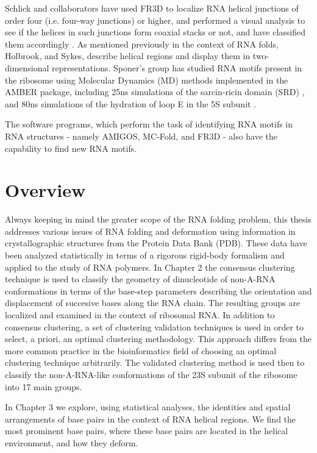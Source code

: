 Schlick and collaborators have used FR3D
to  localize  RNA helical  junctions  of  order  four (i.e.   four-way
junctions) or  higher, and performed a  visual analysis to  see if the
helices  in  such junctions  form  coaxial  stacks  or not,  and  have
classified   them   accordingly   \cite{laing2009,  laing2009a}.    As
mentioned previously in the context of RNA folds, Holbrook, and Sykes,
describe   helical  regions  and   display  them   in  two-dimensional
representations. Sponer's group has studied  RNA
motifs present  in the ribosome using Molecular  Dynamics (MD) methods
implemented  in   the  AMBER   package,   including 25ns
simulations  of   the  sarcin-ricin  domain  (SRD)
\cite{spackova2006},  and 80ns simulations  of the  hydration of
loop E in the 5S subunit \cite{reblova2003}.

The software programs, which perform the task of identifying RNA motifs
in RNA structures - namely AMIGOS, MC-Fold, and FR3D - also have the
capability to find new RNA motifs.

\section{Overview}
Always keeping in  mind the greater scope of  the RNA folding problem,
this thesis  addresses various issues  of RNA folding  and deformation
using information in crystallographic structures from the Protein Data
Bank (PDB). These data have  been analyzed statistically in terms of a
rigorous  rigid-body  formalism  and  applied  to  the  study  of  RNA
polymers.  In Chapter 2 the  consensus clustering technique is used to
classify the  geometry of  dinucleotide of non-A-RNA  conformations in
terms  of  the base-step  parameters  describing  the orientation  and
displacement of  succesive bases along  the RNA chain.   The resulting
groups are localized and examined in the context of ribosomal RNA.  In
addition  to  consensus clustering,  a  set  of clustering  validation
techniques is used in order to select, a priori, an optimal clustering
methodology. This  approach differs from  the more common  practice in
the bioinformatics  field of choosing an  optimal clustering technique
arbitrarily.  The validated clustering method is used then to classify
the non-A-RNA-like  conformations of the  23S subunit of  the ribosome
into 17 main groups.

In Chapter  3 we explore,  using statistical analyses,  the identities
and spatial arrangements  of base pairs in the  context of RNA helical
regions. We find the most prominent base pairs, where these base pairs
are located in the helical environment, and how they deform.

